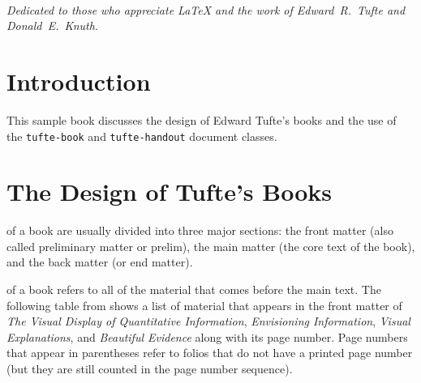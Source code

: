 \documentclass{tufte-book}
\newcommand{\VDQI}{\textit{The Visual Display of Quantitative Information}\xspace}
\newcommand{\EI}{\textit{Envisioning Information}\xspace}
\newcommand{\VE}{\textit{Visual Explanations}\xspace}
\newcommand{\BE}{\textit{Beautiful Evidence}\xspace}
\newcommand{\doccls}[1]{\texttt{#1}}%
\begin{document}
    \tableofcontents
    
    \listoffigures
    
    \listoftables
    
    \cleardoublepage
    ~\vfill
    \begin{doublespace}
    \noindent\fontsize{18}{22}\selectfont\itshape
    \nohyphenation
    Dedicated to those who appreciate \LaTeX{} 
    and the work of \mbox{Edward R.~Tufte} 
    and \mbox{Donald E.~Knuth}.
    \end{doublespace}
    \vfill
    \vfill
    
    
    \cleardoublepage
    \chapter*{Introduction}
    
    This sample book discusses the design of Edward Tufte's
    books\cite{Tufte2001,Tufte1990,Tufte1997,Tufte2006}
    and the use of the \doccls{tufte-book} and \doccls{tufte-handout} document classes.
    
    
    \mainmatter
    
    
    \chapter{The Design of Tufte's Books}
    \label{ch:tufte-design}
    
    
     of a book are usually divided into three major
    sections: the front matter (also called preliminary matter or prelim), the
    main matter (the core text of the book), and the back matter (or end
    matter).
    
     of a book refers to all of the material that
    comes before the main text.  The following table from shows a list of
    material that appears in the front matter of \VDQI, \EI, \VE, and \BE
    along with its page number.  Page numbers that appear in parentheses refer
    to folios that do not have a printed page number (but they are still
    counted in the page number sequence).
    
\end{document}
